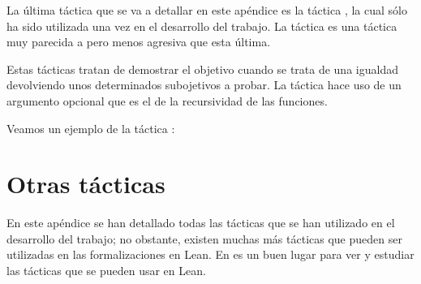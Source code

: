 La última táctica que se va a detallar en este apéndice es la táctica
, la cual sólo ha sido utilizada una vez en el
desarrollo del trabajo. La táctica  es una táctica muy
parecida a  pero menos agresiva que esta última.

Estas tácticas tratan de demostrar el objetivo cuando se trata de una igualdad
devolviendo unos determinados subojetivos a probar. La táctica
 hace uso de un argumento opcional que es el de la
recursividad de las funciones.

Veamos un ejemplo de la táctica :

\begin{leancode}

\end{leancode}

\section{Otras tácticas}

En este apéndice se han detallado todas las tácticas que se han utilizado en
el desarrollo del trabajo; no obstante, existen muchas más tácticas que pueden
ser utilizadas en las formalizaciones en Lean. En \cite{tactic} es un buen
lugar para ver y estudiar las tácticas que se pueden usar en Lean.

